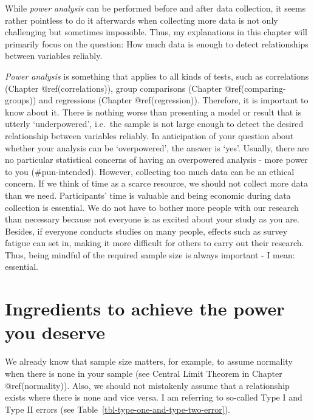 \documentclass[
  letterpaper,
]{krantz}
\begin{document}
While \emph{power analysis} can be performed before and after data
collection, it seems rather pointless to do it afterwards when
collecting more data is not only challenging but sometimes impossible.
Thus, my explanations in this chapter will primarily focus on the
question: How much data is enough to detect relationships between
variables reliably.

\emph{Power analysis} is something that applies to all kinds of tests,
such as correlations (Chapter @ref(correlations)), group comparisons
(Chapter @ref(comparing-groups)) and regressions (Chapter
@ref(regression)). Therefore, it is important to know about it. There is
nothing worse than presenting a model or result that is utterly
`underpowered', i.e.~the sample is not large enough to detect the
desired relationship between variables reliably. In anticipation of your
question about whether your analysis can be `overpowered', the answer is
`yes'. Usually, there are no particular statistical concerns of having
an overpowered analysis - more power to you (\#pun-intended). However,
collecting too much data can be an ethical concern. If we think of time
as a scarce resource, we should not collect more data than we need.
Participants' time is valuable and being economic during data collection
is essential. We do not have to bother more people with our research
than necessary because not everyone is as excited about your study as
you are. Besides, if everyone conducts studies on many people, effects
such as survey fatigue can set in, making it more difficult for others
to carry out their research. Thus, being mindful of the required sample
size is always important - I mean: essential.

\section{Ingredients to achieve the power you
deserve}\label{sec-sec-ingredients-power-analysis}

We already know that sample size matters, for example, to assume
normality when there is none in your sample (see Central Limit Theorem
in Chapter @ref(normality)). Also, we should not mistakenly assume that
a relationship exists where there is none and vice versa. I am referring
to so-called Type I and Type II errors (see
Table~\ref{tbl-type-one-and-type-two-error}).
\end{document}
